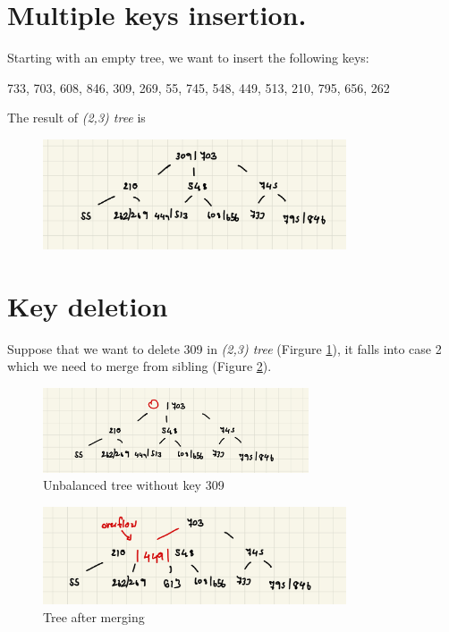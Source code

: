 \documentclass[a4paper, 12pt]{report}
\begin{document}
\section{Multiple keys insertion.}

Starting with an empty tree, we want to insert the following keys:
\begin{center}
        733, 703, 608, 846, 309, 269, 55, 745, 548, 449, 513, 210, 795, 656, 262
\end{center}

The result of \emph{(2,3) tree} is

\begin{figure}[h]
        \centering
        \includegraphics[width=0.8\textwidth,scale=0.5]{tree_insertion.jpeg}
\end{figure}

\section{Key deletion}

\noindent Suppose that we want to delete 309 in \emph{(2,3) tree} (Firgure \ref{fig:tree-deletion-1}), it falls into case 2 which 
we need to merge from sibling (Figure \ref{fig:tree-deletion-2}).

\begin{figure}[h]
        \centering
        \includegraphics[width=0.7\textwidth,scale=0.5]{tree_deletion_1.jpeg}
        \caption{\label{fig:tree-deletion-1} Unbalanced tree without key 309}
\end{figure}

\begin{figure}[h]
        \centering
        \includegraphics[width=0.8\textwidth,scale=0.5]{tree_deletion_2.jpeg}
        \caption{\label{fig:tree-deletion-2} Tree after merging}
\end{figure}
\end{document}
